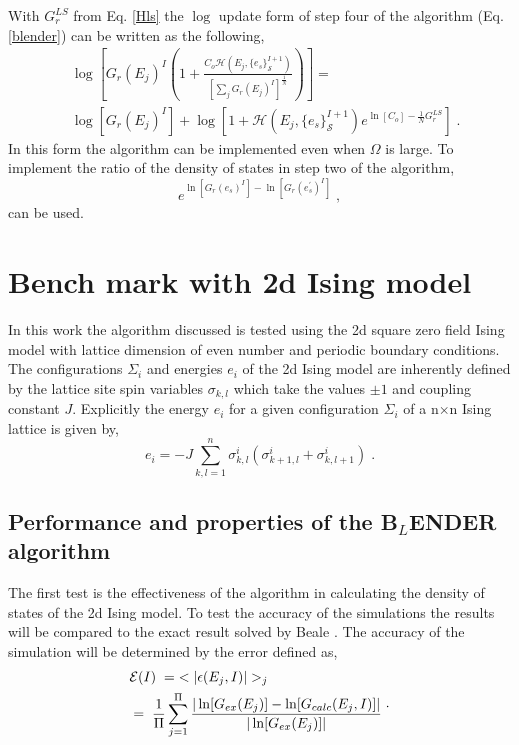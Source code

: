 \documentclass[aps,pre,reprint,superscriptaddress,showkeys]{revtex4-1}
\begin{document}
With $G_r^{LS}$ from Eq. \ref{Hls} the $\log$ update form of step four of the algorithm (Eq. \ref{blender}) can be written as the following, 
\begin{equation}
\begin{split}
& \log[ G_{r}(E_j)^{I}( 1 +  \frac{C_o \mathcal{H}(E_j,\{e_s\}_{\mathcal{S}}^{I+1}) }{ [\sum_j G_{r}(E_j)^{I}]^{\frac{1}{N} } } ) ]=\\
& \log[ G_{r}(E_j)^{I} ] + \log[1 +   \mathcal{H}(E_j,\{e_s\}_{\mathcal{S}}^{I+1})e^{\ln[C_o]-\frac{1}{N}G_{r}^{LS}}] \;.
\end{split}
\end{equation}
In this form  the algorithm can be implemented even when $\Omega$ is large. To implement the ratio of the density of states in step two of the algorithm, 
\begin{equation}
e^{\ln[G_{r}(e_s)^{I}] - \ln[G_{r}(e_s^{'})^{I}]} \;,
\end{equation}
can be used.

 

\section{Bench mark with 2d Ising model}
\label{sec2}

In this work the algorithm discussed is tested using the 2d square zero field  Ising model with lattice dimension of even number\cite{exact_statistical,Onsager,Ising} and periodic boundary conditions. The configurations $\Sigma_i$ and energies $e_i$ of the 2d Ising model are inherently defined by the lattice site spin variables $\sigma_{k,l}$ which take the values $\pm 1$ and coupling constant $J$. Explicitly the energy $e_i$ for a given configuration $\Sigma_i$ of a n$\times$n Ising lattice is given by, 
\begin{equation}
e_i = -J\sum_{k,l=1}^{n}\sigma_{k,l}^{i}(\sigma_{k+1,l}^{i} + \sigma_{k,l+1}^{i})\;.
\end{equation}

\subsection{Performance and properties of the B$_L$ENDER algorithm}
  The first test is the effectiveness of the algorithm in calculating the density of states of the 2d Ising model.  To test the accuracy of the simulations the results will be compared to the exact result solved by Beale \cite{Beale_2d_ising}. The accuracy of the simulation will be determined by the error defined as, 
\begin{equation}
\begin{split}
 &\mathcal{E}(I) \hspace{0.1cm}= \hspace{0.1cm}< |\epsilon(E_j,I)| >_j\\
& = \hspace{0.1cm}  \frac{1}{\Pi} \sum_{j=1}^{\Pi}\frac{|\ln[G_{ex}(E_j)]- \ln[G_{calc}(E_j,I)]|}{|\ln[G_{ex}(E_j)]|}\; 
 \end{split}. 
 \label{avg_error}
\end{equation}
\end{document}
